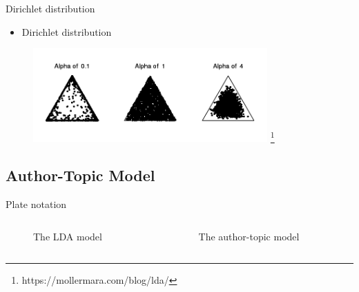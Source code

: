\begin{frame}{\insertsubsection}{Dirichlet distribution}
	\begin{itemize}
		\item Dirichlet distribution
	\end{itemize}
	\begin{figure}
		\includegraphics[width=0.8\textwidth]{figures/dirich.png}
		\let\thefootnote\relax\footnote{\tiny{https://mollermara.com/blog/lda/}}
	\end{figure}
\end{frame}

\subsection{Author-Topic Model}

\begin{frame}{\insertsubsection}{Plate notation}
	\begin{columns}
		\begin{column}{0.45\textwidth}
			\begin{figure}
				\resizebox{\textwidth}{!}{%
				
			}
			\caption*{The LDA model}
			\end{figure}
		\end{column}
		\begin{column}{0.45\textwidth}
			\begin{figure}
				\resizebox{\textwidth}{!}{%
					
				}
				\caption*{The author-topic model}
			\end{figure}
		\end{column}
	\end{columns}
\end{frame}


